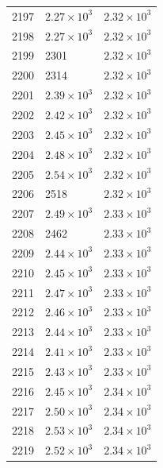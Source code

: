 \begin{table}[H]
\begin{tabular}{lll}
2197 & $\displaystyle 2.27 \times 10^{3}$ & $\displaystyle 2.32 \times 10^{3}$ \\
2198 & $\displaystyle 2.27 \times 10^{3}$ & $\displaystyle 2.32 \times 10^{3}$ \\
2199 & 2301 & $\displaystyle 2.32 \times 10^{3}$ \\
2200 & 2314 & $\displaystyle 2.32 \times 10^{3}$ \\
2201 & $\displaystyle 2.39 \times 10^{3}$ & $\displaystyle 2.32 \times 10^{3}$ \\
2202 & $\displaystyle 2.42 \times 10^{3}$ & $\displaystyle 2.32 \times 10^{3}$ \\
2203 & $\displaystyle 2.45 \times 10^{3}$ & $\displaystyle 2.32 \times 10^{3}$ \\
2204 & $\displaystyle 2.48 \times 10^{3}$ & $\displaystyle 2.32 \times 10^{3}$ \\
2205 & $\displaystyle 2.54 \times 10^{3}$ & $\displaystyle 2.32 \times 10^{3}$ \\
2206 & 2518 & $\displaystyle 2.32 \times 10^{3}$ \\
2207 & $\displaystyle 2.49 \times 10^{3}$ & $\displaystyle 2.33 \times 10^{3}$ \\
2208 & 2462 & $\displaystyle 2.33 \times 10^{3}$ \\
2209 & $\displaystyle 2.44 \times 10^{3}$ & $\displaystyle 2.33 \times 10^{3}$ \\
2210 & $\displaystyle 2.45 \times 10^{3}$ & $\displaystyle 2.33 \times 10^{3}$ \\
2211 & $\displaystyle 2.47 \times 10^{3}$ & $\displaystyle 2.33 \times 10^{3}$ \\
2212 & $\displaystyle 2.46 \times 10^{3}$ & $\displaystyle 2.33 \times 10^{3}$ \\
2213 & $\displaystyle 2.44 \times 10^{3}$ & $\displaystyle 2.33 \times 10^{3}$ \\
2214 & $\displaystyle 2.41 \times 10^{3}$ & $\displaystyle 2.33 \times 10^{3}$ \\
2215 & $\displaystyle 2.43 \times 10^{3}$ & $\displaystyle 2.33 \times 10^{3}$ \\
2216 & $\displaystyle 2.45 \times 10^{3}$ & $\displaystyle 2.34 \times 10^{3}$ \\
2217 & $\displaystyle 2.50 \times 10^{3}$ & $\displaystyle 2.34 \times 10^{3}$ \\
2218 & $\displaystyle 2.53 \times 10^{3}$ & $\displaystyle 2.34 \times 10^{3}$ \\
2219 & $\displaystyle 2.52 \times 10^{3}$ & $\displaystyle 2.34 \times 10^{3}$ \\

\end{tabular}
\end{table}
